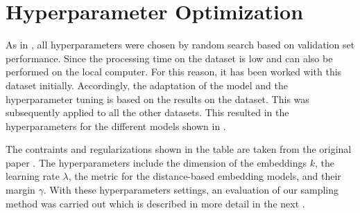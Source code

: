 \section{Hyperparameter Optimization}
\label{sec:hyperparameter_optimization}
%
As in \cite{TuckER}, all hyperparameters were chosen by random search based on validation set performance.
Since the processing time on the \umls dataset is low and can also be performed on the local computer.
For this reason, it has been worked with this dataset initially.
Accordingly, the adaptation of the model and the hyperparameter tuning is based on the results on the \umls dataset.
This was subsequently applied to all the other datasets.
This resulted in the hyperparameters for the different models shown in .


The contraints and regularizations shown in the table are taken from the original paper \cite{cai2017kbgan}.
The hyperparameters include the dimension of the embeddings $k$, the learning rate $\lambda$, the metric for the distance-based embedding models, and their margin $\gamma$.
With these hyperparameters settings, an evaluation of our sampling method \usgan was carried out which is described in more detail in the next .